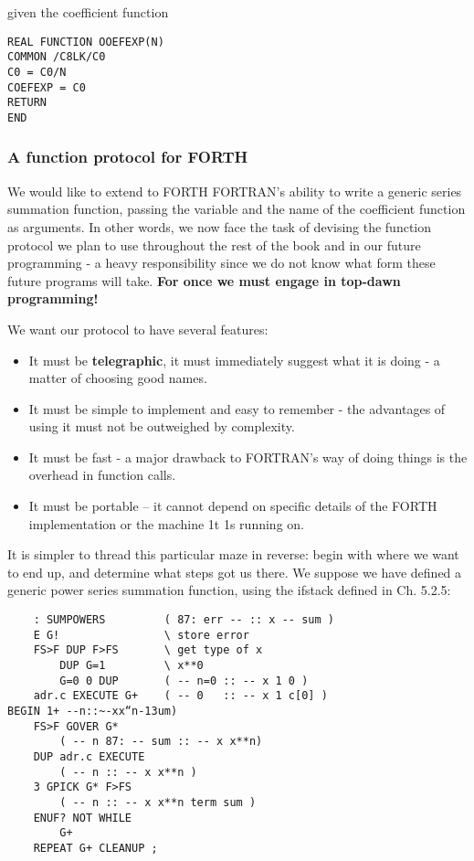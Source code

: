 given the coefficient function

\begin{lstlisting}
REAL FUNCTION OOEFEXP(N)
COMMON /C8LK/C0
C0 = C0/N
COEFEXP = C0
RETURN
END
\end{lstlisting}

\subsubsection{A function protocol for FORTH}

We would like to extend to FORTH FORTRAN's ability to write a generic series summation function, passing the variable and the name of the coefficient function as arguments. In other words, we now face the task of devising the function protocol we plan to use throughout the rest of the book and in our future programming - a heavy responsibility since we do not know what form these future programs will take. \textbf{For once we must engage in top-dawn programming!}

We want our protocol to have several features:
\begin{itemize}
    \item It must be \textbf{telegraphic}, \ie it must immediately suggest what it is doing - a matter of choosing good names.
    \item It must be simple to implement and easy to remember - the advantages of using it must not be outweighed by complexity.
    \item It must be fast - a major drawback to FORTRAN's way of doing things is the overhead in function calls.
    \item It must be portable -- it cannot depend on specific details of the FORTH implementation or the machine 1t 1s running on.
\end{itemize}

It is simpler to thread this particular maze in reverse: begin with where we want to end up, and determine what steps got us there. We suppose we have defined a generic power series summation function, using the ifstack defined in Ch. 5.2.5:
\begin{lstlisting}
    : SUMPOWERS         ( 87: err -- :: x -- sum )
    E G!                \ store error
    FS>F DUP F>FS       \ get type of x
        DUP G=1         \ x**0
        G=0 0 DUP       ( -- n=0 :: -- x 1 0 )
    adr.c EXECUTE G+    ( -- 0   :: -- x 1 c[0] )
BEGIN 1+ --n::~-xx“n-13um)
    FS>F GOVER G*
        ( -- n 87: -- sum :: -- x x**n)
    DUP adr.c EXECUTE
        ( -- n :: -- x x**n )
    3 GPICK G* F>FS
        ( -- n :: -- x x**n term sum )
    ENUF? NOT WHILE
        G+
    REPEAT G+ CLEANUP ;
\end{lstlisting}

